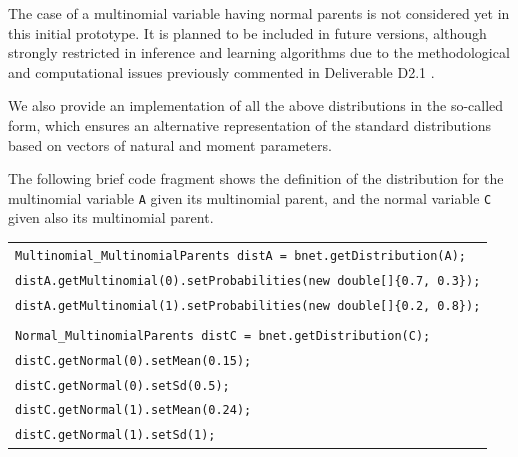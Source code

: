 The case of a multinomial variable having normal parents is not considered yet in this initial prototype. It is planned to be included in future versions, although strongly restricted in inference and learning algorithms due to the methodological and computational issues previously commented in Deliverable D2.1 \cite{Deliverable2.1}. 

We also provide an implementation of all the above distributions in the so-called  form, which ensures an alternative representation of the standard distributions based on vectors of natural and moment parameters.

The following brief code fragment shows the definition of the distribution for the multinomial variable \texttt{A} given its multinomial parent, and the normal variable \texttt{C} given also its multinomial parent.


\begin{table}[H]
\begin{tabular}{l} \hline         
        \texttt{Multinomial\_MultinomialParents distA = bnet.getDistribution(A);}\\
        \texttt{distA.getMultinomial(0).setProbabilities(new double[]\{0.7, 0.3\});}\\
        \texttt{distA.getMultinomial(1).setProbabilities(new double[]\{0.2, 0.8\});}\\\\

        \texttt{Normal\_MultinomialParents distC = bnet.getDistribution(C);}\\
        \texttt{distC.getNormal(0).setMean(0.15);}\\
        \texttt{distC.getNormal(0).setSd(0.5);}\\
        \texttt{distC.getNormal(1).setMean(0.24);}\\
       \texttt{distC.getNormal(1).setSd(1);}\\\hline 
\end{tabular}
\end{table}
